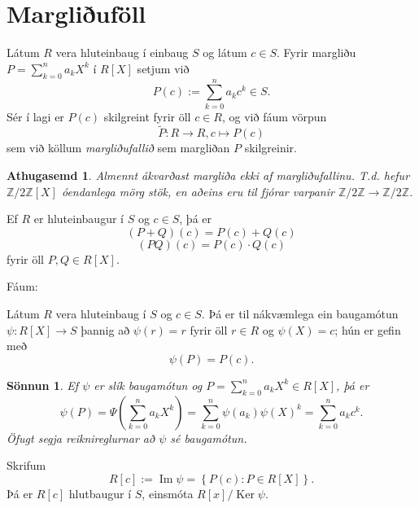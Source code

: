 \documentclass[a4paper,icelandic,11pt]{book}
\theoremstyle{plain}
\newtheorem*{ath}{Athugasemd}
\newtheorem*{sonnun}{Sönnun}
\newcommand{\Z}{\mathbb{Z}}
\DeclareMathOperator{\im}{Im} %
\DeclareMathOperator{\Ker}{Ker} %
\begin{document}
\section{Margliðuföll}
\begin{skilgr}
  Látum $R$ vera hluteinbaug í einbaug $S$ og látum $c\in S$. Fyrir margliðu
  $P = \sum_{k=0}^{n} a_k X^k$ í $R[X]$ setjum við\[
  P(c) := \sum_{k=0}^{n} a_k c^k\in S.
  \]
  Sér í lagi er $P(c)$ skilgreint fyrir öll $c\in R$, og við fáum vörpun\[
  \tilde{P}:R\to R, c\mapsto P(c)
  \]
  sem við köllum \emph{margliðufallið} sem margliðan
  $P$ skilgreinir.
\end{skilgr}
\begin{ath}
  Almennt ákvarðast margliða \emph{ekki} af margliðufallinu. T.d. hefur
  $\Z/2\Z[X]$ óendanlega mörg stök, en aðeins eru til fjórar varpanir $\Z/2\Z\to
  \Z/2\Z$.
\end{ath}
\begin{setn}
  [Reiknireglur]
  Ef $R$ er hluteinbaugur í $S$ og $c\in S$, þá er\[
  (P+Q)(c) = P(c) + Q(c)
  \]\[
  (PQ)(c) = P(c)\cdot Q(c)
  \]
  fyrir öll $P,Q\in R[X]$.
\end{setn}
Fáum:
\begin{setn}
  Látum $R$ vera hluteinbaug í $S$ og $c\in S$. Þá er til nákvæmlega ein
  baugamótun $\psi:R[X]\to S$ þannig að $\psi(r)=r$ fyrir öll $r\in R$ og
  $\psi(X) = c$; hún er gefin með\[
  \psi(P) = P(c).
  \]
\end{setn}
\begin{sonnun}
  Ef $\psi$ er slík baugamótun og $P = \sum_{k=0}^{n}a_k X^k \in R[X]$, þá er\[
  \psi(P)
  = \Psi\left( \sum_{k=0}^{n}a_k X^k \right)
  = \sum_{k=0}^{n}\psi(a_k)\psi(X)^k
  = \sum_{k=0}^{n} a_k c^k.
  \]
  Öfugt segja reiknireglurnar að $\psi$ sé baugamótun.
\end{sonnun}
\begin{skilgr}
  Skrifum \[
  R[c] := \im\psi = \left\{ P(c):P\in R[X] \right\}.
  \]
  Þá er $R[c]$ hlutbaugur í $S$, einsmóta $R[x]/\Ker\psi$.
\end{skilgr}
\end{document}
